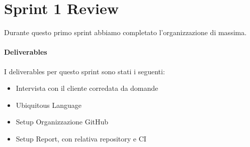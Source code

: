 \section{Sprint 1 Review}
Durante questo primo sprint abbiamo completato l'organizzazione di massima.
\paragraph{Deliverables} 
I deliverables per questo sprint sono stati i seguenti:
\begin{itemize}
    \item Intervista con il cliente corredata da domande
    \item Ubiquitous Language
    \item Setup Organizzazione GitHub
    \item Setup Report, con relativa repository e CI
\end{itemize}
